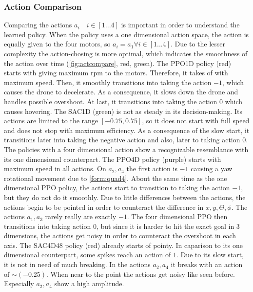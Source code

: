 \subsubsection{Action Comparison}
Comparing the actions $a_i \quad i \in [1...4]$ is important in order to understand
the learned policy.
When the policy uses a one dimensional action space, the action is equally given
to the four motors, so $a_i = a_1 \forall i \in [1...4]$.
Due to the lesser complexity the action-chosing is more optimal, which
indicates the smoothness of the action over time (\cref{fig:actcompare}, red, green).
The PPO1D policy (red) starts with giving maximum rpm to the motors.
Therefore, it takes of with maximum speed. Then, it smoothly transitions
into taking the action $-1$, which causes the drone to decelerate. As a consequence,
it slows down the drone and handles possible overshoot. At last, it transitions
into taking the action $0$ which causes hovering.
The SAC1D (green) is not as steady in its decision-making. Its actions are 
limited to the range $[-0.75, 0.75]$, so it does not start with full speed
and does not stop with maximum efficiency. As a consequence of the
slow start, it transitions later into taking the negative action and also, later
to taking action $0$.
The policies with a four dimensional action show a recognizable resemblance with 
its one dimensional counterpart.
The PPO4D policy (purple) starts with maximum speed in all actions.
On $a_2, a_4$ the first action is $-1$ causing a yaw rotational movement due to 
\cref{form:quad4}. About the same time as the one dimensional PPO policy,
the actions start to transition to taking the action $-1$, but they do not do it smoothly.
Due to little differences between the actions, the actions begin to be pointed
in order to counteract the difference in $x, y, \Theta, \phi$. 
The actions $a_1, a_3$ rarely really are exactly $-1$. The four dimensional
PPO then transitions into taking action $0$, but since it is harder to hit 
the exact goal in 3 dimensions, the actions get noisy in order to counteract
the overshoot in each axis.
The SAC4D48 policy (red) already starts of pointy. In caparison to its
one dimensional counterpart, some spikes reach an action of $1$.
Due to its slow start, it is not in need of much breaking.
In the actions $a_2, a_4$ it breaks with an action of $\sim (-0.25)$. 
When near to the point the actions get noisy like seen before. Especially
$a_2, a_4$ show a high amplitude. 

